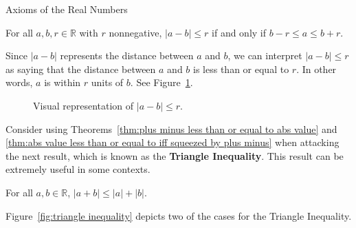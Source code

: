\begin{section}{Axioms of the Real Numbers}
\begin{corollary}\label{cor:distance between two points less than or equal to}
For all $a,b,r\in\mathbb{R}$ with $r$ nonnegative, $|a-b|\leq r$ if and only if $b-r\leq a\leq b+r$.
\end{corollary}

Since $|a-b|$ represents the distance between $a$ and $b$, we can interpret $|a-b|\leq r$ as saying that the distance between $a$ and $b$ is less than or equal to $r$. In other words, $a$ is within $r$ units of $b$. See Figure~\ref{fig:visual of |a-b|<r}.

\begin{figure}[h!]
\centering
{}
\caption{Visual representation of $|a-b|\leq r$.}\label{fig:visual of |a-b|<r}
\end{figure}

Consider using Theorems~\ref{thm:plus minus less than or equal to abs value} and \ref{thm:abs value less than or equal to iff squeezed by plus minus} when attacking the next result, which is known as the \textbf{Triangle Inequality}.  This result can be extremely useful in some contexts. 

\begin{theorem}\label{thm:triangle inequality}
For all $a,b\in\mathbb{R}$, $|a+b|\leq |a|+|b|$.
\end{theorem}

Figure~\ref{fig:triangle inequality} depicts two of the cases for the Triangle Inequality.  


\end{section}
